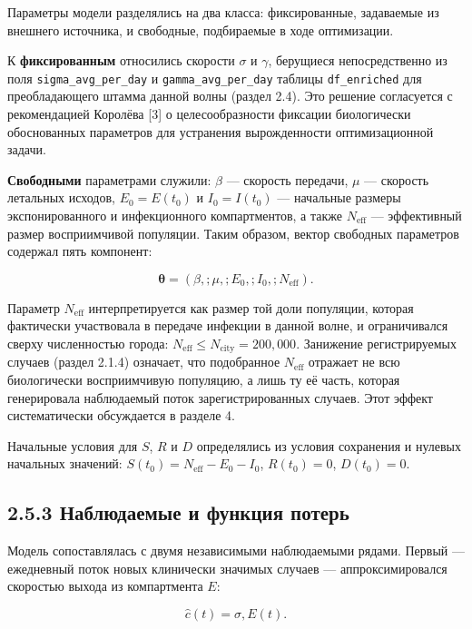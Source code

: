 \documentclass[12pt]{article}
\begin{document}
Параметры модели разделялись на два класса: фиксированные, задаваемые из
внешнего источника, и свободные, подбираемые в ходе оптимизации.

К \textbf{фиксированным} относились скорости \(\sigma\) и \(\gamma\),
берущиеся непосредственно из поля \texttt{sigma\_avg\_per\_day} и
\texttt{gamma\_avg\_per\_day} таблицы \texttt{df\_enriched} для
преобладающего штамма данной волны (раздел 2.4). Это решение согласуется
с рекомендацией Королёва {[}3{]} о целесообразности фиксации
биологически обоснованных параметров для устранения вырожденности
оптимизационной задачи.

\textbf{Свободными} параметрами служили: \(\beta\) --- скорость
передачи, \(\mu\) --- скорость летальных исходов, \(E_0 = E(t_0)\) и
\(I_0 = I(t_0)\) --- начальные размеры экспонированного и инфекционного
компартментов, а также \(N_{\text{eff}}\) --- эффективный размер
восприимчивой популяции. Таким образом, вектор свободных параметров
содержал пять компонент:

\[\boldsymbol{\theta} = (\beta,; \mu,; E_0,; I_0,; N_{\text{eff}}).\]

Параметр \(N_{\text{eff}}\) интерпретируется как размер той доли
популяции, которая фактически участвовала в передаче инфекции в данной
волне, и ограничивался сверху численностью города:
\(N_{\text{eff}} \leq N_{\text{city}} = 200,000\). Занижение
регистрируемых случаев (раздел 2.1.4) означает, что подобранное
\(N_{\text{eff}}\) отражает не всю биологически восприимчивую популяцию,
а лишь ту её часть, которая генерировала наблюдаемый поток
зарегистрированных случаев. Этот эффект систематически обсуждается в
разделе 4.

Начальные условия для \(S\), \(R\) и \(D\) определялись из условия
сохранения и нулевых начальных значений:
\(S(t_0) = N_{\text{eff}} - E_0 - I_0\), \(R(t_0) = 0\), \(D(t_0) = 0\).

\subsection{2.5.3 Наблюдаемые и функция
потерь}\label{ux43dux430ux431ux43bux44eux434ux430ux435ux43cux44bux435-ux438-ux444ux443ux43dux43aux446ux438ux44f-ux43fux43eux442ux435ux440ux44c}

Модель сопоставлялась с двумя независимыми наблюдаемыми рядами. Первый
--- ежедневный поток новых клинически значимых случаев ---
аппроксимировался скоростью выхода из компартмента \(E\):

\[\hat{c}(t) = \sigma, E(t).\]
\end{document}
